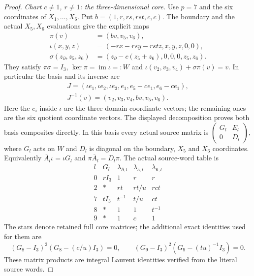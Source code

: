 \begin{proof}
\emph{Chart $c\ne1$, $r\ne1$: the three-dimensional core.}
Use $p=7$ and the six coordinates of
$X_1,\ldots,X_6$. Put $b=(1,r,rs,rst,c,c)$.
The boundary and the actual $X_5,X_6$ evaluations
give the explicit maps
\[
 \begin{aligned}
 \pi(v)&=(bv,v_5,v_6),\\
 \iota(x,y,z)&=(-rx-rsy-rstz,x,y,z,0,0),\\
 \sigma(z_\partial,z_5,z_6)
             &=(z_\partial-c(z_5+z_6),0,0,0,z_5,z_6).
 \end{aligned}                                                \tag{F.29.10}
\]
They satisfy $\pi\sigma=I_3$,
$\ker\pi=\operatorname{im}\iota=:W$ and
$\iota(v_2,v_3,v_4)+\sigma\pi(v)=v$.
In particular the basis and its inverse are
\[
 \begin{gathered}
 J=(\iota e_1,\iota e_2,\iota e_3,e_1,e_5-ce_1,e_6-ce_1),\\
 J^{-1}(v)=(v_2,v_3,v_4,bv,v_5,v_6).
 \end{gathered}                                                \tag{F.29.11}
\]
Here the $e_i$ inside $\iota$ are the three
domain coordinate vectors; the remaining ones
are the six quotient coordinate vectors.
The displayed decomposition proves both basis
composites directly.
In this basis every actual source matrix is
$\left(\begin{smallmatrix}G_l&E_l\\0&D_l\end{smallmatrix}\right)$,
where $G_l$ acts on $W$ and $D_l$ is diagonal
on the boundary, $X_5$ and $X_6$ coordinates.
Equivalently $\overline A_l\iota=\iota G_l$ and
$\pi\overline A_l=D_l\pi$.
The actual source-word table is
\[
 \begin{array}{c|c|ccc}
 l&G_l&\lambda_{\partial,l}&\lambda_{5,l}&\lambda_{6,l}\\\hline
 0&rI_3&1&r&r\\
 2&*&rt&rt/u&rct\\
 7&tI_3&t^{-1}&t/u&ct\\
 8&*&1&1&t^{-1}\\
 9&*&1&c&1
 \end{array}
                                                               \tag{F.29.12}
\]
The stars denote retained full core matrices;
the additional exact identities used for them are
\[
 (G_8-I_3)^2(G_8-(c/u)I_3)=0,
 \qquad (G_9-I_3)^2(G_9-(tu)^{-1}I_3)=0.
                                                               \tag{F.29.13}
\]
These matrix products are integral Laurent
identities verified from the literal source words.


\end{proof}
